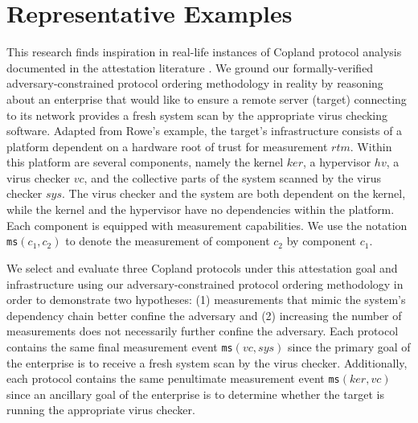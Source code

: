 \documentclass[runningheads]{llncs}
\theoremstyle{definition}
\begin{document}
\section{Representative Examples}

This research finds inspiration in real-life instances of Copland protocol analysis documented in the attestation literature \cite{Rowe:2021:OnOrdering,Coker::Principles-of-R}. We ground our formally-verified adversary-constrained protocol ordering methodology in reality by reasoning about an enterprise that would like to ensure a remote server (target) connecting to its network provides a fresh system scan by the appropriate virus checking software. Adapted from Rowe's \cite{Rowe:2016:Confining} example, the target's infrastructure consists of a platform dependent on a hardware root of trust for measurement $rtm$. Within this platform are several components, namely the kernel $ker$, a hypervisor $hv$, a virus checker $vc$, and the collective parts of the system scanned by the virus checker $sys$. The virus checker and the system are both dependent on the kernel, while the kernel and the hypervisor have no dependencies within the platform. Each component is equipped with measurement capabilities. We use the notation \texttt{ms}$(c_1,c_2)$ to denote the measurement of component $c_2$ by component $c_1$.

We select and evaluate three Copland protocols under this attestation goal and infrastructure using our adversary-constrained protocol ordering methodology in order to demonstrate two hypotheses: (1) measurements that mimic the system's dependency chain better confine the adversary and (2) increasing the number of measurements does not necessarily further confine the adversary. Each protocol contains the same final measurement event \texttt{ms}$(vc,sys)$ since the primary goal of the enterprise is to receive a fresh system scan by the virus checker. Additionally, each protocol contains the same penultimate measurement event \texttt{ms}$(ker,vc)$ since an ancillary goal of the enterprise is to determine whether the target is running the appropriate virus checker.
\end{document}
